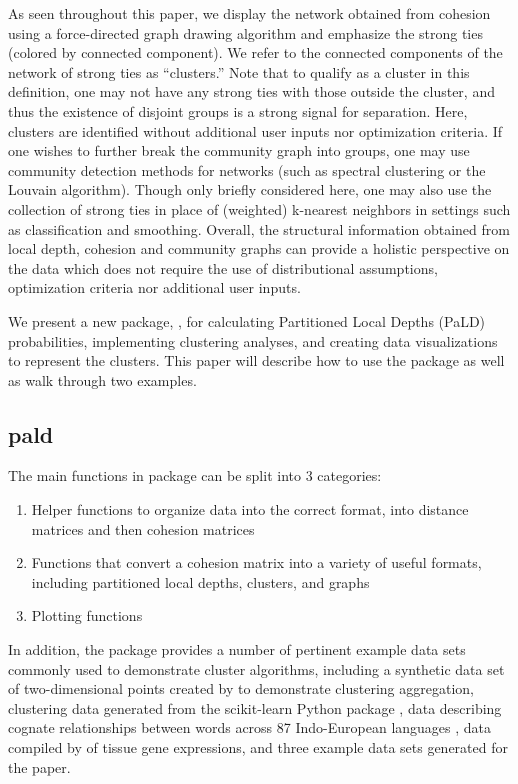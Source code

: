 As seen throughout this paper, we display the network obtained from
cohesion using a force-directed graph drawing algorithm and emphasize
the strong ties (colored by connected component). We refer to the
connected components of the network of strong ties as ``clusters.'' Note
that to qualify as a cluster in this definition, one may not have any
strong ties with those outside the cluster, and thus the existence of
disjoint groups is a strong signal for separation. Here, clusters are
identified without additional user inputs nor optimization criteria. If
one wishes to further break the community graph into groups, one may use
community detection methods for networks (such as spectral clustering or
the Louvain algorithm). Though only briefly considered here, one may
also use the collection of strong ties in place of (weighted) k-nearest
neighbors in settings such as classification and smoothing. Overall, the
structural information obtained from local depth, cohesion and community
graphs can provide a holistic perspective on the data which does not
require the use of distributional assumptions, optimization criteria nor
additional user inputs.

We present a new package, , for calculating Partitioned
Local Depths (PaLD) probabilities, implementing clustering analyses, and
creating data visualizations to represent the clusters. This paper will
describe how to use the package as well as walk through two examples.

\hypertarget{pald}{%
\subsection{pald}\label{pald}}

The main functions in  package can be split into 3
categories:

\begin{enumerate}
\def\labelenumi{\arabic{enumi}.}
\tightlist
\item
  Helper functions to organize data into the correct format, into
  distance matrices and then cohesion matrices
\item
  Functions that convert a cohesion matrix into a variety of useful
  formats, including partitioned local depths, clusters, and graphs
\item
  Plotting functions
\end{enumerate}

In addition, the package provides a number of pertinent example data
sets commonly used to demonstrate cluster algorithms, including a
synthetic data set of two-dimensional points created by
\citet{gionis1clustering} to demonstrate clustering aggregation,
clustering data generated from the scikit-learn Python package
\citep{pedregosa2011scikit}, data describing cognate relationships
between words across 87 Indo-European languages \citep{dyen92}, data
compiled by \cite{tissue} of tissue gene expressions, and three example
data sets generated for the \citet{berenhaut2022social} paper.

